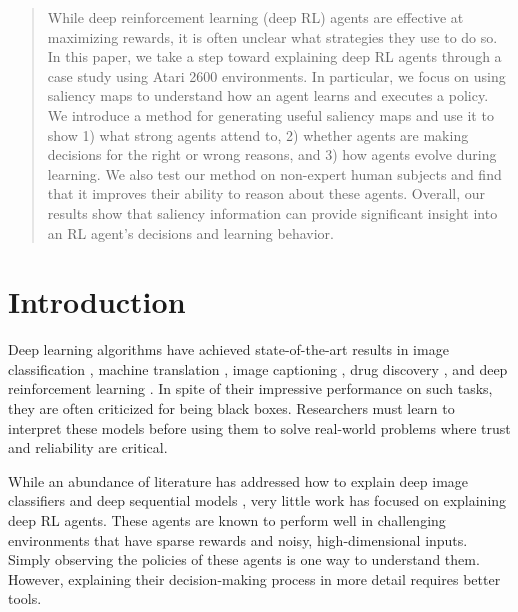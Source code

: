 \documentclass{article}
\begin{document}
\begin{abstract}
While deep reinforcement learning (deep RL) agents are effective at maximizing rewards, it is often unclear what strategies they use to do so. In this paper, we take a step toward explaining deep RL agents through a case study using Atari 2600 environments. In particular, we focus on using saliency maps to understand how an agent learns and executes a policy. We introduce a method for generating useful saliency maps and use it to show 1) what strong agents attend to, 2) whether agents are making decisions for the right or wrong reasons, and 3) how agents evolve during learning. We also test our method on non-expert human subjects and find that it improves their ability to reason about these agents. Overall, our results show that saliency information can provide significant insight into an RL agent's decisions and learning behavior.
\end{abstract}

\section{Introduction}

Deep learning algorithms have achieved state-of-the-art results in image classification \cite{He, Krizhevsky2012ImageNetNetworks}, machine translation \cite{Mikolov2010RecurrentModel}, image captioning \cite{Karpathy2015DeepDescriptions}, drug discovery \cite{Dahl2014Multi-taskPredictions}, and deep reinforcement learning \cite{Mnih2015Human-levelLearning, Silver2017MasteringKnowledge}. In spite of their impressive performance on such tasks, they are often criticized for being black boxes. Researchers must learn to interpret these models before using them to solve real-world problems where trust and reliability are critical.

While an abundance of literature has addressed how to explain deep image classifiers \cite{Fong2017InterpretablePerturbation, Ribeiro2016WhyClassifier, Simonyan2014DeepMaps, Zhang2016Top-downBackprop} and deep sequential models \cite{Karpathy2016VisualizingNetworks, Murdoch2017AutomaticNetworks}, very little work has focused on explaining deep RL agents. These agents are known to perform well in challenging environments that have sparse rewards and noisy, high-dimensional inputs. Simply observing the policies of these agents is one way to understand them. However, explaining their decision-making process in more detail requires better tools.
\end{document}
